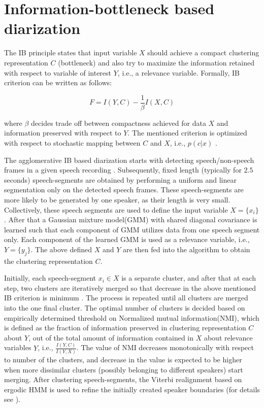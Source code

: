 \documentclass[conference]{IEEEtran}
\begin{document}
\section{Information-bottleneck based diarization}
\label{system}


The IB principle states that input variable $X$ should achieve a compact
clustering representation $C$ (bottleneck) and also try to maximize the
information retained with respect to variable of interest $Y$, i.e., a relevance
variable. Formally, IB criterion can be written as follows:

\begin{equation}
\label{eq:aIB}
F = I(Y,C) - \frac{1}{\beta}I(X,C) 
\end{equation} 

where $\beta$ decides trade off between compactness achieved for data $X$ and
information preserved with respect to $Y$. The mentioned criterion is optimized
with respect to stochastic mapping between $C$ and $X$, i.e., $p(c|x)$ . 

The agglomerative IB based diarization starts with detecting speech/non-speech
frames in a given speech recording \cite{aIB2}. Subsequently, fixed length
(typically for $2.5$ seconds) speech-segments are obtained by performing a
uniform and linear segmentation only on the detected speech frames. These
speech-segments are more likely to be generated by one speaker, as their length
is very small. Collectively, these speech segments are used to define the input
variable $X={\{x_i\}}$. After that a Gaussian mixture model(GMM) with shared
diagonal covariance is learned such that each component of GMM utilizes data
from one speech segment only. Each component of the learned GMM is used as a
relevance variable, i.e., $Y = \{ y_{j}\}$. The above defined $X$ and $Y$ are
then fed into the algorithm to obtain the clustering representation $C$. 

Initially, each speech-segment $x_i \in X$ is a separate cluster, and after that
at each step, two clusters are iteratively merged so that decrease in the above
mentioned IB criterion is minimum \cite{aIB2}. The process is repeated until all
clusters are merged into the one final cluster. The optimal number of clusters
is decided based on empirically determined threshold on Normalized mutual
information(NMI), which is defined as the fraction of information preserved in
clustering representation $C$ about $Y$, out of the total amount of information
contained in $X$ about relevance variables $Y$, i.e., $\frac{I(Y,C)}{I(Y,X)}$.
The value of NMI decreases monotonically with respect to number of the clusters,
and decrease in the value is expected to be higher when more dissimilar clusters
(possibly belonging to different speakers) start merging.  After clustering
speech-segments, the Viterbi realignment based on ergodic HMM is used to refine
the initially created speaker boundaries (for details see \cite{aIB2}).
\end{document}
